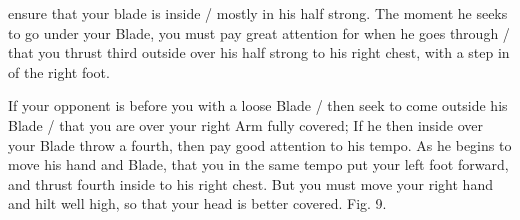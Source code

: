 \newpage


\newpage



ensure that your blade is inside / mostly in his half strong. The
moment he seeks to go under your Blade, you must pay great attention
for when he goes through / that you thrust third outside over his half
strong to his right chest, with a step in of the right foot.

\exercise{}


If your opponent is before you with a loose Blade / then seek to come
outside his Blade / that you are over your right Arm fully covered; If
he then inside over your Blade throw a fourth, then pay good attention
to his tempo. As he begins to move his hand and Blade, that you in the
same tempo put your left foot forward, and thrust fourth inside to his
right chest. But you must move your right hand and hilt well high, so
that your head is better covered. Fig. 9.

\exercise{}


